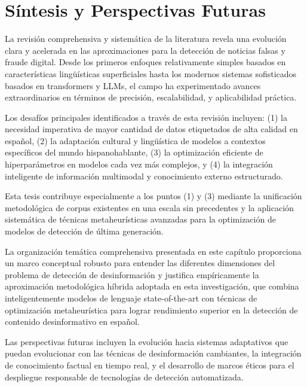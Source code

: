\section{Síntesis y Perspectivas Futuras}
\label{sec:sintesis_perspectivas}

La revisión comprehensiva y sistemática de la literatura revela una evolución clara y acelerada en las aproximaciones para la detección de noticias falsas y fraude digital. Desde los primeros enfoques relativamente simples basados en características lingüísticas superficiales hasta los modernos sistemas sofisticados basados en transformers y LLMs, el campo ha experimentado avances extraordinarios en términos de precisión, escalabilidad, y aplicabilidad práctica.

Los desafíos principales identificados a través de esta revisión incluyen: (1) la necesidad imperativa de mayor cantidad de datos etiquetados de alta calidad en español, (2) la adaptación cultural y lingüística de modelos a contextos específicos del mundo hispanohablante, (3) la optimización eficiente de hiperparámetros en modelos cada vez más complejos, y (4) la integración inteligente de información multimodal y conocimiento externo estructurado.

Esta tesis contribuye especialmente a los puntos (1) y (3) mediante la unificación metodológica de corpus existentes en una escala sin precedentes y la aplicación sistemática de técnicas metaheurísticas avanzadas para la optimización de modelos de detección de última generación.

La organización temática comprehensiva presentada en este capítulo proporciona un marco conceptual robusto para entender las diferentes dimensiones del problema de detección de desinformación y justifica empíricamente la aproximación metodológica híbrida adoptada en esta investigación, que combina inteligentemente modelos de lenguaje state-of-the-art con técnicas de optimización metaheurística para lograr rendimiento superior en la detección de contenido desinformativo en español.

Las perspectivas futuras incluyen la evolución hacia sistemas adaptativos que puedan evolucionar con las técnicas de desinformación cambiantes, la integración de conocimiento factual en tiempo real, y el desarrollo de marcos éticos para el despliegue responsable de tecnologías de detección automatizada.